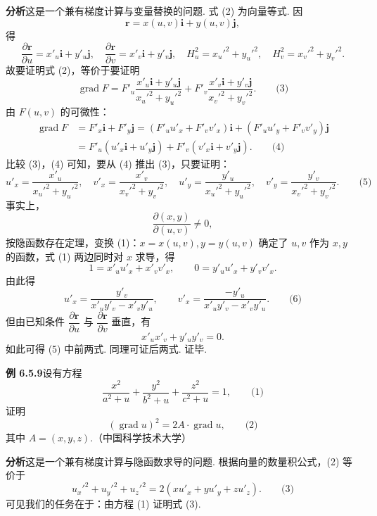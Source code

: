\documentclass[UTF8, 12pt, fontset=fandol, oneside]{ctexart}
\begin{document}
\noindent\textbf{分析}\quad 这是一个兼有梯度计算与变量替换的问题. 式 (2) 为向量等式. 因
\[
  \mathbf r=x(u,v)\mathbf i+y(u,v)\mathbf j,
\]
得
\[
  \frac{\partial\mathbf r}{\partial u}=x'_u\mathbf i+y'_u\mathbf j,\quad
  \frac{\partial\mathbf r}{\partial v}=x'_v\mathbf i+y'_v\mathbf j,\quad
  H_u^2=x_u'^2+y_u'^2,\quad H_v^2=x_v'^2+y_v'^2.
\]
故要证明式 (2)，等价于要证明
\[
  \operatorname{grad}F
  =
  F'_u\frac{x'_u\mathbf i+y'_u\mathbf j}{x_u'^2+y_u'^2}
  +
  F'_v\frac{x'_v\mathbf i+y'_v\mathbf j}{x_v'^2+y_v'^2}. \qquad\text{(3)}
\]
由 $F(u,v)$ 的可微性：
\[
\begin{aligned}
  \operatorname{grad}F
  &=F'_x\mathbf i+F'_y\mathbf j
  =(F'_u u'_x+F'_v v'_x)\mathbf i+(F'_u u'_y+F'_v v'_y)\mathbf j\\
  &=F'_u(u'_x\mathbf i+u'_y\mathbf j)+F'_v(v'_x\mathbf i+v'_y\mathbf j). \qquad\text{(4)}
\end{aligned}
\]
比较 (3)，(4) 可知，要从 (4) 推出 (3)，只要证明：
\[
  u'_x=\frac{x'_u}{x_u'^2+y_u'^2},\quad
  v'_x=\frac{x'_v}{x_v'^2+y_v'^2},\quad
  u'_y=\frac{y'_u}{x_u'^2+y_u'^2},\quad
  v'_y=\frac{y'_v}{x_v'^2+y_v'^2}. \qquad\text{(5)}
\]
事实上，
\[
  \frac{\partial(x,y)}{\partial(u,v)}\ne0,
\]
按隐函数存在定理，变换 (1)：$x=x(u,v),y=y(u,v)$ 确定了 $u,v$ 作为 $x,y$ 的函数，式 (1) 两边同时对 $x$ 求导，得
\[
  1=x'_u u'_x+x'_v v'_x,\qquad
  0=y'_u u'_x+y'_v v'_x.
\]
由此得
\[
  u'_x=\frac{y'_v}{x'_uy'_v-x'_vy'_u},\qquad
  v'_x=\frac{-y'_u}{x'_uy'_v-x'_vy'_u}. \qquad\text{(6)}
\]
但由已知条件 $\dfrac{\partial\mathbf r}{\partial u}$ 与
$\dfrac{\partial\mathbf r}{\partial v}$ 垂直，有
\[
  x'_ux'_v+y'_uy'_v=0.
\]
如此可得 (5) 中前两式. 同理可证后两式. 证毕.

\noindent\textbf{例 6.5.9}\quad 设有方程
\[
  \frac{x^2}{a^2+u}+\frac{y^2}{b^2+u}+\frac{z^2}{c^2+u}=1, \qquad\text{(1)}
\]
证明
\[
  (\operatorname{grad}u)^2=2A\cdot\operatorname{grad}u, \qquad\text{(2)}
\]
其中 $A=(x,y,z)$.（中国科学技术大学）

\noindent\textbf{分析}\quad 这是一个兼有梯度计算与隐函数求导的问题. 根据向量的数量积公式，(2) 等价于
\[
  u_x'^2+u_y'^2+u_z'^2=2(xu'_x+yu'_y+zu'_z). \qquad\text{(3)}
\]
可见我们的任务在于：由方程 (1) 证明式 (3).
\end{document}
